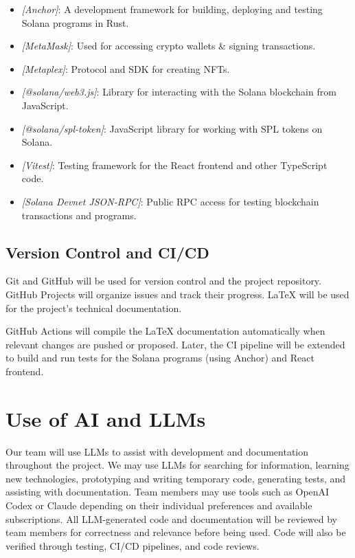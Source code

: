 \documentclass{article}
\begin{document}
\begin{itemize}
  \item \textit{[Anchor]}: A development framework for building, deploying and testing Solana programs in Rust.
  \item \textit{[MetaMask]}: Used for accessing crypto wallets \& signing transactions.
  \item \textit{[Metaplex]}: Protocol and SDK for creating NFTs.
  \item \textit{[@solana/web3.js]}: Library for interacting with the Solana blockchain from JavaScript.
  \item \textit{[@solana/spl-token]}: JavaScript library for working with SPL tokens on Solana.
  \item \textit{[Vitest]}: Testing framework for the React frontend and other TypeScript code.
  \item \textit{[Solana Devnet JSON-RPC]}: Public RPC access for testing blockchain transactions and programs.
\end{itemize}

\subsection{Version Control and CI/CD}
Git and GitHub will be used for version control and the project repository. GitHub Projects will
organize issues and track their progress. LaTeX will be used for the
project's technical documentation.

GitHub Actions will compile the LaTeX documentation automatically when relevant
changes are pushed or proposed. Later, the CI pipeline will be extended to
build and run tests for the Solana programs (using Anchor) and React frontend.

\section{Use of AI and LLMs}
Our team will use LLMs to assist with development and documentation throughout the project. We may use LLMs for searching for information, learning new technologies, prototyping and writing temporary code, generating tests, and assisting with documentation. Team members may use tools such as OpenAI Codex or Claude depending on their individual preferences and available subscriptions. All LLM-generated code and documentation will be reviewed by team members for correctness and relevance before being used. Code will also be verified through testing, CI/CD pipelines, and code reviews.
\end{document}
